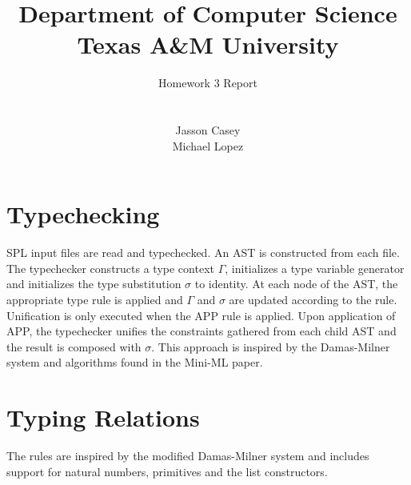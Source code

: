 \documentclass{article}
\title{
Department of Computer Science \\Texas A\&M University}
\author{\LARGE Homework 3 Report\\ \\
\\Jasson Casey
\\Michael Lopez }
\begin{document}
\maketitle

\section{Typechecking}
SPL input files are read and typechecked. An AST is constructed from each file. The typechecker constructs a type context $\Gamma$, initializes a type variable generator and initializes the type substitution $\sigma$ to identity. At each node of the AST, the appropriate type rule is applied and $\Gamma$ and $\sigma$ are updated according to the rule. Unification is only executed when the APP rule is applied. Upon application of APP, the typechecker unifies the constraints gathered from each child AST and the result is composed with $\sigma$. This approach is inspired by the Damas-Milner system and algorithms found in the Mini-ML paper.


\section{Typing Relations}

The rules are inspired by the modified Damas-Milner system and includes support for natural numbers, primitives and the list constructors.
\end{document}
